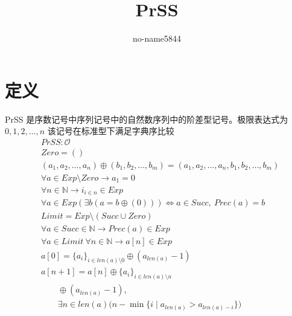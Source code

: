 \documentclass[UTF8]{ctexart}
\title{PrSS}
\author{no-name5844}
\begin{document}
\maketitle

\section{定义}
PrSS 是序数记号中序列记号中的自然数序列中的阶差型记号。极限表达式为 $0,1,2,\dots,n$
该记号在标准型下满足字典序比较
\begin{align*}
&PrSS:\mathcal{O}\\
&Zero=()\\
&(a_1,a_2,\dots,a_n)\oplus(b_1,b_2,\dots,b_m)=(a_1,a_2,\dots,a_n,b_1,b_2,\dots,b_m)\\
&\forall a\in Exp\setminus Zero\to a_1=0\\
&\forall n\in\mathbb{N}\to{i}_{i\in n}\in Exp\\
&\forall a\in Exp(\exists b(a=b\oplus(0)))\Leftrightarrow a\in Succ,\ Prec(a)=b\\
&Limit=Exp\setminus(Succ\cup Zero)\\
&\forall a\in Succ\in\mathbb{N}\to Prec(a)\in Exp\\
&\forall a\in Limit\ \forall n\in\mathbb{N}\to a[n]\in Exp\\
&a[0]=\{a_i\}_{i\in len(a)\setminus0}\oplus(a_{len(a)}-1)\\
&a[n+1]=a[n]\oplus\{a_i\}_{i\in len(a)\setminus n}\\
&\qquad\oplus(a_{len(a)}-1),\\
&\qquad\exists n\in len(a)\bigl(n-\min\{i\mid a_{len(a)}>a_{len(a)-i}\}\bigr)
\end{align*}
\end{document}
